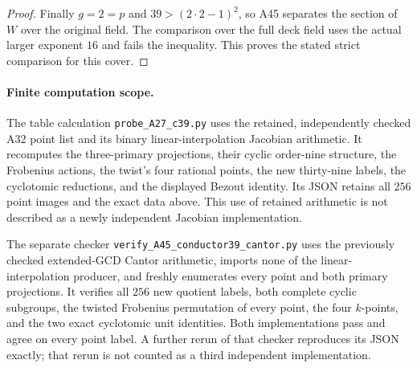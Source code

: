 \begin{proof}
Finally $g=2=p$ and $39>(2\cdot2-1)^2$, so A45 separates
the section of $W$ over the original field. The comparison
over the full deck field uses the actual larger exponent
$16$ and fails the inequality. This proves the stated strict
comparison for this cover.
\end{proof}

\paragraph{Finite computation scope.}
The table calculation \texttt{probe\_A27\_c39.py} uses the
retained, independently checked A32 point list and its binary
linear-interpolation Jacobian arithmetic. It recomputes the
three-primary projections, their cyclic order-nine structure,
the Frobenius actions, the twist's four rational points, the
new thirty-nine labels, the cyclotomic reductions, and the
displayed Bezout identity. Its JSON retains all $256$ point
images and the exact data above. This use of retained arithmetic
is not described as a newly independent Jacobian implementation.


The separate checker \texttt{verify\_A45\_conductor39\_cantor.py}
uses the previously checked extended-GCD Cantor arithmetic,
imports none of the linear-interpolation producer, and freshly
enumerates every point and both primary projections. It verifies
all $256$ new quotient labels, both complete cyclic subgroups,
the twisted Frobenius permutation of every point, the four
$k$-points, and the two exact cyclotomic unit identities.
Both implementations pass and agree on every point label.
A further rerun of that checker reproduces its JSON exactly;
that rerun is not counted as a third independent implementation.
